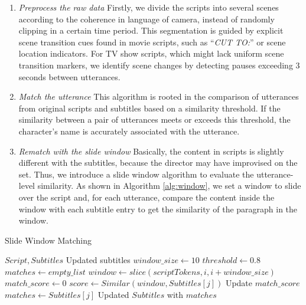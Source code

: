 \begin{enumerate}
      \item \textit{Preprocess the raw data} Firstly, we divide the scripts into several scenes according to the coherence in language of camera, instead of randomly clipping in a certain time period. This segmentation is guided by explicit scene transition cues found in movie scripts, such as ``\textit{CUT TO:}'' or scene location indicators. For TV show scripts, which might lack uniform scene transition markers, we identify scene changes by detecting pauses exceeding 3 seconds between utterances.
      \item \textit{Match the utterance} This algorithm is rooted in the comparison of utterances from original scripts and subtitles based on a similarity threshold. If the similarity between a pair of utterances meets or exceeds this threshold, the character's name is accurately associated with the utterance.
      \item \textit{Rematch with the slide window} Basically, the content in scripts is slightly different with the subtitles, because the director may have improvised on the set. Thus, we introduce a slide window algorithm to evaluate the utterance-level similarity. As shown in Algorithm \ref{alg:window}, we set a window to slide over the script and, for each utterance, compare the content inside the window with each subtitle entry to get the similarity of the paragraph in the window. 
\end{enumerate}

\begin{algorithm}[h]
	\caption{Slide Window Matching}
	\small
	\label{alg:window}
	\renewcommand{\algorithmicrequire}{\textbf{Input:}}
	\renewcommand{\algorithmicensure}{\textbf{Output:}}
	
	\begin{algorithmic}[1]
		\REQUIRE $Script, Subtitles$
		\ENSURE Updated subtitles 
		\STATE $window\_size \gets 10$
		\STATE $threshold \gets 0.8$
		\STATE $matches \gets empty\_list$
		\STATE $window \gets slice(scriptTokens, i, i + window\_size)$
		\STATE $match\_score \gets 0$
		\STATE $score \gets Similar(window, Subtitles[j])$
		\STATE Update $match\_score$
		\ENDIF
		\ENDFOR
		\STATE $matches \gets Subtitles[j]$
		\ENDIF
		\ENDFOR
		\RETURN Updated $Subtitles$ with $matches$
	\end{algorithmic}
\end{algorithm}

